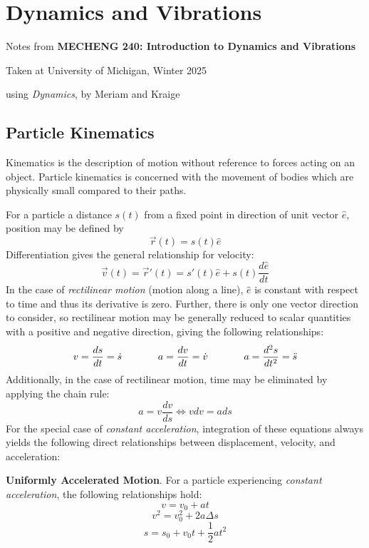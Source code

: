\section{Dynamics and Vibrations}

\begin{center}
    Notes from \textbf{MECHENG 240: Introduction to Dynamics and Vibrations}

    Taken at University of Michigan, Winter 2025

    using \textit{Dynamics}, by Meriam and Kraige
\end{center}

\subsection{Particle Kinematics} %

Kinematics is the description of motion without reference to forces acting on an object. Particle kinematics is concerned with the movement of bodies which are physically small compared to their paths. 

For a particle a distance $s(t)$ from a fixed point in direction of unit vector $\hat e$, position may be defined by \[\vec{r}(t) = s(t)\hat e\] Differentiation gives the general relationship for velocity: \[\vec{v}(t) = \vec{r}'(t) = s'(t)\hat e + s(t)\frac{d\hat e}{dt}\] In the case of \textit{rectilinear motion} (motion along a line), $\hat{e}$ is constant with respect to time and thus its derivative is zero. Further, there is only one vector direction to consider, so rectilinear motion may be generally reduced to scalar quantities with a positive and negative direction, giving the following relationships: \[v = \frac{ds}{dt} = \dot s \hspace{0.5in} a = \frac{dv}{dt} = \dot v\hspace{0.5in} a=\frac{d^2s}{dt^2} = \ddot s\] Additionally, in the case of rectilinear motion, time may be eliminated by applying the chain rule: \[a = v\frac{dv}{ds} \iff vdv = ads\] For the special case of \textit{constant acceleration}, integration of these equations always yields the following direct relationships between displacement, velocity, and acceleration:
\begin{shaded}
    \textbf{Uniformly Accelerated Motion}. For a particle experiencing \textit{constant acceleration}, the following relationships hold:
    \[v = v_0 + at\]
    \[v^2 = v_0^2 + 2a\Delta s\]
    \[s = s_0 + v_0t + \frac{1}{2}at^2\]
\end{shaded}

